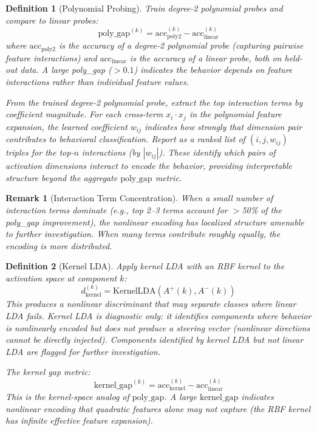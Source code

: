 \documentclass[11pt]{article}
\newtheorem{definition}{Definition}[section]
\newtheorem{remark}{Remark}[section]
\begin{document}
\begin{definition}[Polynomial Probing]
\label{def:polynomial-probing}
Train degree-2 polynomial probes and compare to linear probes:
\begin{equation}
\text{poly\_gap}^{(k)} = \text{acc}_{\text{poly2}}^{(k)} - \text{acc}_{\text{linear}}^{(k)}
\end{equation}
where $\text{acc}_{\text{poly2}}$ is the accuracy of a degree-2 polynomial probe (capturing pairwise feature interactions) and $\text{acc}_{\text{linear}}$ is the accuracy of a linear probe, both on held-out data. A large poly\_gap ($> 0.1$) indicates the behavior depends on feature interactions rather than individual feature values.

From the trained degree-2 polynomial probe, extract the top interaction terms by coefficient magnitude. For each cross-term $x_i \cdot x_j$ in the polynomial feature expansion, the learned coefficient $w_{ij}$ indicates how strongly that dimension pair contributes to behavioral classification. Report as a ranked list of $(i, j, w_{ij})$ triples for the top-$n$ interactions (by $|w_{ij}|$). These identify which pairs of activation dimensions interact to encode the behavior, providing interpretable structure beyond the aggregate $\text{poly\_gap}$ metric.
\end{definition}

\begin{remark}[Interaction Term Concentration]
\label{rem:interaction-term-concentration}
When a small number of interaction terms dominate (e.g., top 2--3 terms account for $>$50\% of the poly\_gap improvement), the nonlinear encoding has localized structure amenable to further investigation. When many terms contribute roughly equally, the encoding is more distributed.
\end{remark}

\begin{definition}[Kernel LDA]
\label{def:kernel-lda}
Apply kernel LDA with an RBF kernel to the activation space at component $k$:
\begin{equation}
d^{(k)}_{\text{kernel}} = \text{KernelLDA}(A^+(k), A^-(k))
\end{equation}
This produces a nonlinear discriminant that may separate classes where linear LDA fails. Kernel LDA is diagnostic only: it identifies components where behavior is nonlinearly encoded but does not produce a steering vector (nonlinear directions cannot be directly injected). Components identified by kernel LDA but not linear LDA are flagged for further investigation.

The kernel gap metric:
\begin{equation}
\text{kernel\_gap}^{(k)} = \text{acc}_{\text{kernel}}^{(k)} - \text{acc}_{\text{linear}}^{(k)}
\end{equation}
This is the kernel-space analog of $\text{poly\_gap}$. A large $\text{kernel\_gap}$ indicates nonlinear encoding that quadratic features alone may not capture (the RBF kernel has infinite effective feature expansion).
\end{definition}
\end{document}
